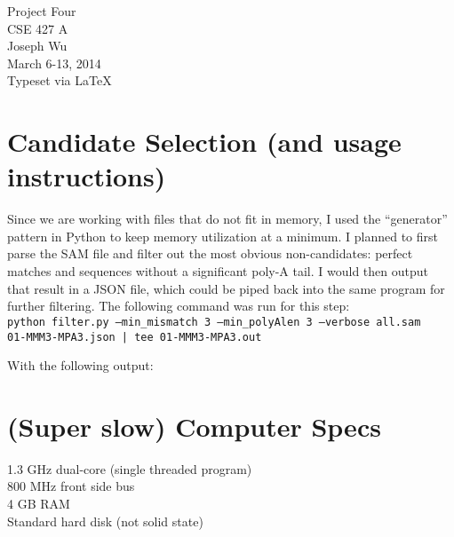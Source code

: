 \documentclass[a4paper, 12pt]{report}
\begin{document}
    \begin{center}
        {\LARGE Project Four} \\
        CSE 427 A \\
        Joseph Wu  \\
        March 6-13, 2014 \\
        {\tiny Typeset via \LaTeX}
    \end{center}
    
\section{Candidate Selection (and usage instructions)}
    Since we are working with files that do not fit in memory, 
        I used the ``generator'' pattern in Python to keep memory utilization at a minimum.
    I planned to first parse the SAM file and filter out the most obvious non-candidates:
        perfect matches and sequences without a significant poly-A tail.
    I would then output that result in a JSON file, 
        which could be piped back into the same program for further filtering.
    The following command was run for this step: \\
    \texttt{python filter.py --min\_mismatch 3 --min\_polyAlen 3 --verbose all.sam \\
            01-MMM3-MPA3.json | tee 01-MMM3-MPA3.out}
    
    With the following output: \\

\section{(Super slow) Computer Specs}
    1.3 GHz dual-core (single threaded program) \\
    800 MHz front side bus \\
    4 GB RAM \\
    Standard hard disk (not solid state)
\end{document}
